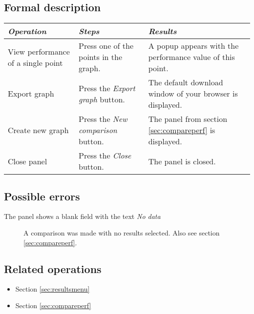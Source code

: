   \subsection*{Formal description}
    \begin{tabularx}{\textwidth}{XXX}
    \toprule
    \emph{Operation} & \emph{Steps} & \emph{Results} \\
    \midrule
    View performance of a single point & Press one of the points in the graph. & A popup appears with the performance value of this point. \\
    \midrule
    Export graph & Press the \emph{Export graph} button. & The default download window of your browser is displayed. \\
    \midrule
    Create new graph & Press the \emph{New comparison} button. & The panel from section \ref{sec:compareperf} is displayed. \\
    \midrule
    Close panel & Press the \emph{Close} button. & The panel is closed. \\
    \bottomrule
\end{tabularx}

  \subsection*{Possible errors}
  \begin{description}
  \item[The panel shows a blank field with the text \emph{No data}] A comparison was made with no results selected. Also see section \ref{sec:compareperf}.\\
  \end{description}

  \subsection*{Related operations}
   \begin{itemize}
   \item Section \ref{sec:resultsmenu}
   \item Section \ref{sec:compareperf}
  \end{itemize}

